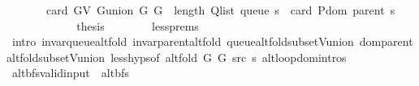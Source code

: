 \begin{isabellebody}
\ \ \ \ \ \ \ card\ {\isacharparenleft}{\kern0pt}G{\isachardot}{\kern0pt}V\ {\isacharparenleft}{\kern0pt}G{\isachardot}{\kern0pt}union\ G{}\ G{}{\isacharparenright}{\kern0pt}{\isacharparenright}{\kern0pt}\ {\isacharplus}{\kern0pt}\ length\ {\isacharparenleft}{\kern0pt}Q{\isacharunderscore}{\kern0pt}list\ {\isacharparenleft}{\kern0pt}queue\ s{\isacharparenright}{\kern0pt}{\isacharparenright}{\kern0pt}\ {\isacharminus}{\kern0pt}\ card\ {\isacharparenleft}{\kern0pt}P{\isachardot}{\kern0pt}dom\ {\isacharparenleft}{\kern0pt}parent\ s{\isacharparenright}{\kern0pt}{\isacharparenright}{\kern0pt}{\isachardoublequoteclose}\isanewline
\ \ \ \ \ \ \isacommand{{\isachardot}{\kern0pt}}\isamarkupfalse%
\isanewline
\ \ \ \ \isamarkupfalse%
\ {\isacharquery}{\kern0pt}thesis\isanewline
\ \ \ \ \ \ \isamarkupfalse%
\ less{\isachardot}{\kern0pt}prems\isanewline
\ \ \ \ \ \ \isamarkupfalse%
\ {\isacharparenleft}{\kern0pt}intro\ invar{\isacharunderscore}{\kern0pt}queue{\isacharunderscore}{\kern0pt}alt{\isacharunderscore}{\kern0pt}fold\ invar{\isacharunderscore}{\kern0pt}parent{\isacharunderscore}{\kern0pt}alt{\isacharunderscore}{\kern0pt}fold\ queue{\isacharunderscore}{\kern0pt}alt{\isacharunderscore}{\kern0pt}fold{\isacharunderscore}{\kern0pt}subset{\isacharunderscore}{\kern0pt}V{\isacharunderscore}{\kern0pt}union\ dom{\isacharunderscore}{\kern0pt}parent{\isacharunderscore}{\kern0pt}alt{\isacharunderscore}{\kern0pt}fold{\isacharunderscore}{\kern0pt}subset{\isacharunderscore}{\kern0pt}V{\isacharunderscore}{\kern0pt}union\ less{\isachardot}{\kern0pt}hyps{\isacharbrackleft}{\kern0pt}of\ {\isachardoublequoteopen}alt{\isacharunderscore}{\kern0pt}fold\ G{}\ G{}\ src\ s{\isachardoublequoteclose}{\isacharbrackright}{\kern0pt}\ alt{\isacharunderscore}{\kern0pt}loop{\isachardot}{\kern0pt}domintros{\isacharparenright}{\kern0pt}\isanewline
\ \ \isamarkupfalse%
\isanewline
{}\isamarkupfalse%
%
\endisatagproof
{\isafoldproof}%
%
\isadelimproof
\isanewline
%
\endisadelimproof
\isanewline
{}\isamarkupfalse%
%
\isadelimdocument
%
\endisadelimdocument
%
\isatagdocument
%
\isamarkuptrue%
%
\isamarkuptrue%
%
\endisatagdocument
{\isafolddocument}%
%
\isadelimdocument
%
\endisadelimdocument
{}\isamarkupfalse%
\ alt{\isacharunderscore}{\kern0pt}bfs{\isacharunderscore}{\kern0pt}valid{\isacharunderscore}{\kern0pt}input\ {\isacharequal}{\kern0pt}\ alt{\isacharunderscore}{\kern0pt}bfs\ \isanewline

\end{isabellebody}
